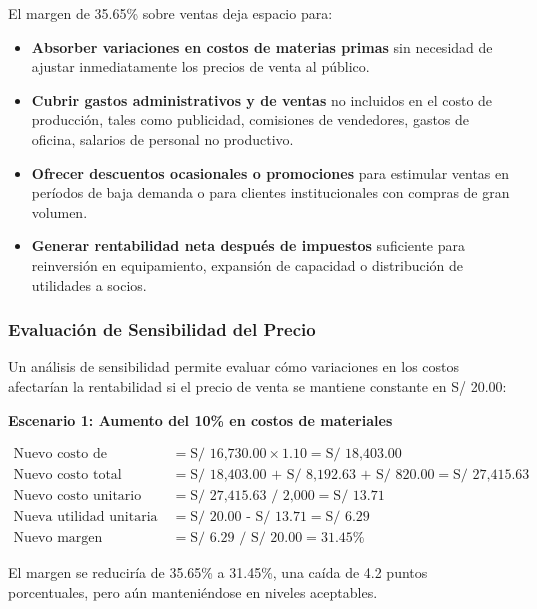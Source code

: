\documentclass[
  stu,
  floatsintext,
  longtable,
  a4paper,
  nolmodern,
  notxfonts,
  notimes,
  12pt,
  colorlinks=true,linkcolor=blue,citecolor=blue,urlcolor=blue]{apa7}
\providecommand{\tightlist}{%
  \setlength{\itemsep}{0pt}\setlength{\parskip}{0pt}}
\begin{document}
El margen de 35.65\% sobre ventas deja espacio para:

\begin{itemize}
\tightlist
\item
  \textbf{Absorber variaciones en costos de materias primas} sin
  necesidad de ajustar inmediatamente los precios de venta al público.
\item
  \textbf{Cubrir gastos administrativos y de ventas} no incluidos en el
  costo de producción, tales como publicidad, comisiones de vendedores,
  gastos de oficina, salarios de personal no productivo.
\item
  \textbf{Ofrecer descuentos ocasionales o promociones} para estimular
  ventas en períodos de baja demanda o para clientes institucionales con
  compras de gran volumen.
\item
  \textbf{Generar rentabilidad neta después de impuestos} suficiente
  para reinversión en equipamiento, expansión de capacidad o
  distribución de utilidades a socios.
\end{itemize}

\subsubsection{Evaluación de Sensibilidad del
Precio}\label{evaluaciuxf3n-de-sensibilidad-del-precio}

Un análisis de sensibilidad permite evaluar cómo variaciones en los
costos afectarían la rentabilidad si el precio de venta se mantiene
constante en S/ 20.00:

\textbf{Escenario 1: Aumento del 10\% en costos de materiales}

\[
\begin{aligned}
\text{Nuevo costo de materiales} &= \text{S/ 16,730.00} \times 1.10 = \text{S/ 18,403.00} \\
\text{Nuevo costo total} &= \text{S/ 18,403.00 + S/ 8,192.63 + S/ 820.00} = \text{S/ 27,415.63} \\
\text{Nuevo costo unitario} &= \text{S/ 27,415.63 / 2,000} = \text{S/ 13.71} \\
\text{Nueva utilidad unitaria} &= \text{S/ 20.00 - S/ 13.71} = \text{S/ 6.29} \\
\text{Nuevo margen} &= \text{S/ 6.29 / S/ 20.00} = 31.45\%
\end{aligned}
\]

El margen se reduciría de 35.65\% a 31.45\%, una caída de 4.2 puntos
porcentuales, pero aún manteniéndose en niveles aceptables.
\end{document}
